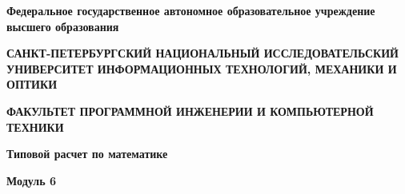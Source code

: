 \documentclass[12pt]{article}
\begin{document}
	\pagestyle{empty}
	
	\begin{center}
		\normalsize
		\textbf{Федеральное государственное автономное образовательное учреждение высшего образования}

		\small
		\medskip 
		\textbf{САНКТ-ПЕТЕРБУРГСКИЙ НАЦИОНАЛЬНЫЙ ИССЛЕДОВАТЕЛЬСКИЙ  УНИВЕРСИТЕТ ИНФОРМАЦИОННЫХ ТЕХНОЛОГИЙ, МЕХАНИКИ И ОПТИКИ}

		\medskip 
		\textbf{ФАКУЛЬТЕТ ПРОГРАММНОЙ ИНЖЕНЕРИИ И КОМПЬЮТЕРНОЙ ТЕХНИКИ}	
	\bigskip\bigskip\bigskip\bigskip\bigskip\bigskip\bigskip\bigskip\bigskip\bigskip\bigskip\bigskip	
		\par\medskip\par\smallskip\par\smallskip
		\Large 
		\textbf{Типовой расчет по математике} 

		\textbf{Модуль 6}


\end{center}
\end{document}
